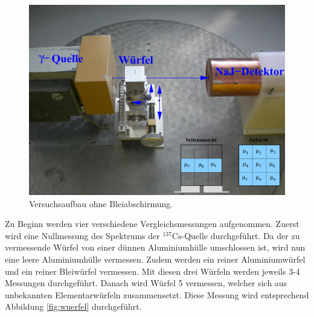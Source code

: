\begin{figure}
  \centering
  \includegraphics[scale=0.5]{graphics/Aufbau.png}
  \caption{Versuchsaufbau ohne Bleiabschirmung.\cite{anleitung}}
  \label{fig:aufbau}
\end{figure}

Zu Beginn werden vier verschiedene Vergleichsmessungen aufgenommen. Zuerst wird eine Nullmessung des Spektrums der ${}^{137}\text{Cs}$-Quelle durchgeführt.
Da der zu vermessende Würfel von einer dünnen Aluminiumhülle umschlossen ist, wird nun eine leere Aluminiumhülle vermessen. Zudem werden ein reiner
Aluminiumwürfel und ein reiner Bleiwürfel vermessen. Mit diesen drei Würfeln werden jeweils 3-4 Messungen durchgeführt. Danach wird Würfel 5 vermessen,
welcher sich aus unbekannten Elementarwürfeln zusammensetzt. Diese Messung wird entsprechend Abbildung \ref{fig:wuerfel} durchgeführt.
\newpage

